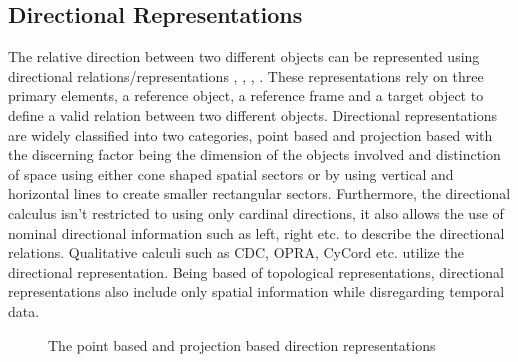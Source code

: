 		\subsection{Directional Representations} The relative direction between two different objects can be represented using directional relations/representations \cite{cohn1997qualitative}, \cite{chen2015survey}, \cite{cohn2001qualitative}, \cite{cohn2008qualitative}. These representations rely on three primary elements, a reference object, a reference frame and a target object to define a valid relation between two different objects. Directional representations are widely classified into two categories, point based and projection based with the discerning factor being the dimension of the objects involved and distinction of space using either cone shaped spatial sectors or by using vertical and horizontal lines to create smaller rectangular sectors. Furthermore, the directional calculus isn't restricted to using only cardinal directions, it also allows the use of nominal directional information such as left, right etc. to describe the directional relations. Qualitative calculi such as CDC, OPRA, CyCord etc. utilize the directional representation. Being based of topological representations, directional representations also include only spatial information while disregarding temporal data.
		
		\begin{figure}[h!]%
			\centering
			\qquad
			\caption{The point based and projection based direction representations \cite{chen2015survey}}%
			\label{fig:example}%
		\end{figure}
	
